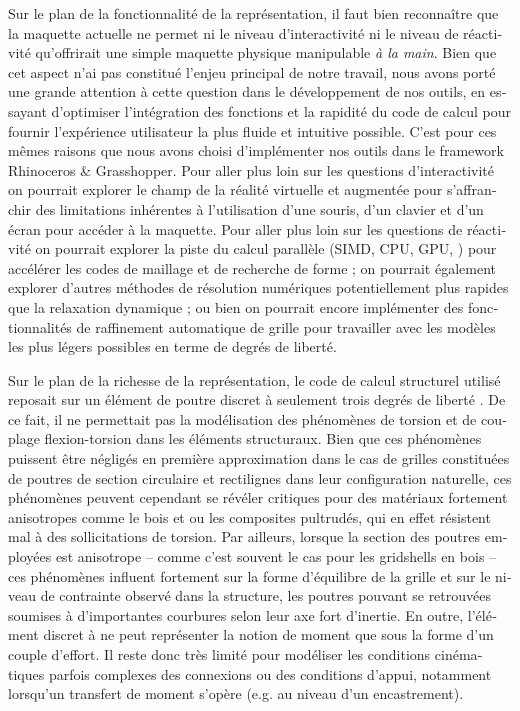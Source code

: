\begin{otherlanguage}{french}
Sur le plan de la fonctionnalité de la représentation, il faut bien reconnaître que la maquette actuelle ne permet ni le niveau d'interactivité ni le niveau de réactivité qu'offrirait une simple maquette physique manipulable \emph{à la main}. Bien que cet aspect n'ai pas constitué l'enjeu principal de notre travail, nous avons porté une grande attention à cette question dans le développement de nos outils, en essayant d'optimiser l'intégration des fonctions et la rapidité du code de calcul pour fournir l'expérience utilisateur la plus fluide et intuitive possible. C'est pour ces mêmes raisons que nous avons choisi d'implémenter nos outils dans le framework Rhinoceros \& Grasshopper. Pour aller plus loin sur les questions d'interactivité on pourrait explorer le champ de la réalité virtuelle et augmentée pour s'affranchir des limitations inhérentes à l'utilisation d'une souris, d'un clavier et d'un écran pour accéder à la maquette. Pour aller plus loin sur les questions de réactivité on pourrait explorer la piste du calcul parallèle (SIMD, CPU, GPU, \telp{}) pour accélérer les codes de maillage et de recherche de forme ; on pourrait également explorer d'autres méthodes de résolution numériques potentiellement plus rapides que la relaxation dynamique ; ou bien on pourrait encore implémenter des fonctionnalités de raffinement automatique de grille pour travailler avec les modèles les plus légers possibles en terme de degrés de liberté.

Sur le plan de la richesse de la représentation, le code de calcul structurel utilisé reposait sur un élément de poutre discret à seulement trois degrés de liberté \cite{Adriaenssens2000}. De ce fait, il ne permettait pas la modélisation des phénomènes de torsion et de couplage flexion-torsion dans les éléments structuraux. Bien que ces phénomènes puissent être négligés en première approximation dans le cas de grilles constituées de poutres de section circulaire et rectilignes dans leur configuration naturelle, ces phénomènes peuvent cependant se révéler critiques pour des matériaux fortement anisotropes comme le bois et ou les composites pultrudés, qui en effet résistent mal à des sollicitations de torsion. Par ailleurs, lorsque la section des poutres employées est anisotrope -- comme c'est souvent le cas pour les gridshells en bois -- ces phénomènes influent fortement sur la forme d'équilibre de la grille et sur le niveau de contrainte observé dans la structure, les poutres pouvant se retrouvées soumises à d'importantes courbures selon leur axe fort d'inertie. En outre, l'élément discret à  ne peut représenter la notion de moment que sous la forme d'un couple d'effort. Il reste donc très limité pour modéliser les conditions cinématiques parfois complexes des connexions ou des conditions d'appui, notamment lorsqu'un transfert de moment s'opère (e.g. au niveau d'un encastrement).


\end{otherlanguage}
